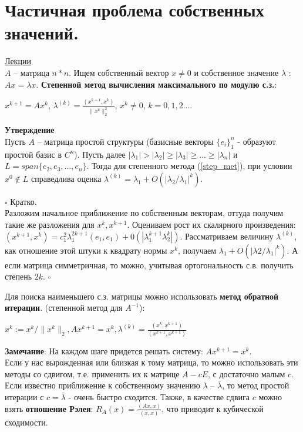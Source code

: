 \documentclass[specialist, subf, href, colorlinks=true, 12pt, times, mtpro, final]{disser}
\theoremstyle{definition}
\begin{document}
\section {Частичная проблема собственных значений.}
	\hyperlink {lects.78}{Лекции}\\
	$A$ \--- матрица $n*n$. Ищем собственный вектор $x \ne 0$ и собственное значение $\lambda$ : $Ax = \lambda x$.
	\textbf{Степенной метод вычисления максимального по модулю с.з.}:\\
	\begin{center}
	\label{step_met}
	$x^{k+1} = Ax^k$,  $\lambda^{(k)} = \frac{(x^{k+1}, x^k)}{\|x^k\|^2_2}$, $x^k \ne 0$,  $k=0,1,2...$.
	\end{center}
	\textbf{Утверждение}\\
	Пусть $A$ \--- матрица простой структуры (базисные векторы $\{e_i\}^n_1$ - образуют простой базис в $C^n$). Пусть далее $|\lambda_1| > |\lambda_2| \geq |\lambda_3| \geq ... \geq |\lambda_n|$ и $L=span\{e_2,e_3,...,e_n\}$. Тогда для степенного метода (\ref{step_met}), при условии $x^0 \notin L$ справедлива оценка $\lambda^{(k)} = \lambda_1 + O(|\lambda_2/\lambda_1|^k)$.
	
	$\square$ Кратко.\\
	Разложим начальное приближение по собственным векторам, оттуда получим такие же разложения для $x^k, x^{k+1}$. Оцениваем рост их скалярного произведения: $(x^{k+1}, x^k) = c^2_1 \lambda^{2k+1}_1 (e_1, e_1) + 0(|\lambda^{k+1}_1\lambda^k_2|)$.
	Рассматриваем величину $\lambda^{(k)}$, как отношение этой штуки к квадрату нормы $x^k$,  получаем $\lambda_1 + O(|\lambda2/\lambda_1|^k)$. А если матрица симметричная, то можно, учитывая ортогональность с.в. получить степень $2k$. 
	$\square$
	
	
	Для поиска наименьшего с.з. матрицы можно использовать \textbf{метод обратной итерации}. (степенной метод для $A^{-1}$):\\
	\begin{center}
	$x^k := x^k / \|x^k\|_2, Ax^{k+1} = x^k, \lambda^{(k)} = \frac{(x^k, x^{k+1})}{(x^{k+1}, x^{k+1})}$
	\end{center}
	
	\textbf{Замечание}: На каждом шаге придется решать систему: $Ax^{k+1} = x^k$.
\\
Если у нас вырожденная или близкая к тому матрица, то можно использовать эти методы со сдвигом, т.е. применить их к матрице $A-cE$, с достаточно малым $c$.  Если известно приближение к собственному значению $\lambda$ \--- $\overline{\lambda}$, то метод простой итерации с $c = \overline{\lambda}$ - очень быстро сходится. Также, в качестве сдвига $c$ можно взять \textbf{отношение Рэлея}: $R_A(x) = \frac{(Ax, x)}{(x, x)}$, что приводит к кубической сходимости.
	
\end{document}
